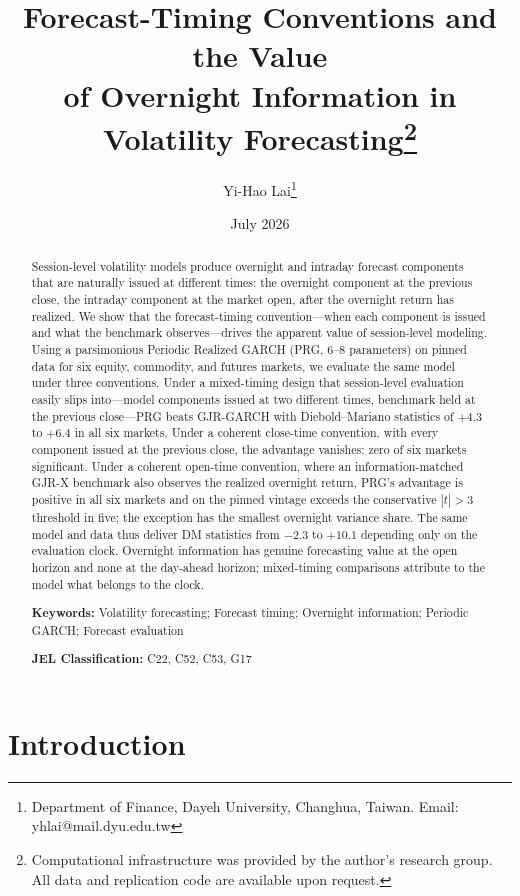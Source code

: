\documentclass[11pt,a4paper]{article}
\title{Forecast-Timing Conventions and the Value \\ of Overnight Information in Volatility Forecasting\thanks{%
Computational infrastructure was provided by the author's research group.
All data and replication code are available upon request.}}
\author{Yi-Hao Lai\thanks{%
Department of Finance, Dayeh University, Changhua, Taiwan.
Email: yhlai@mail.dyu.edu.tw}}
\date{July 2026}
\begin{document}
\maketitle

\begin{abstract}
Session-level volatility models produce overnight and intraday forecast components that are naturally issued at different times: the overnight component at the previous close, the intraday component at the market open, after the overnight return has realized. We show that the forecast-timing convention---when each component is issued and what the benchmark observes---drives the apparent value of session-level modeling. Using a parsimonious Periodic Realized GARCH (PRG, 6--8 parameters) on pinned data for six equity, commodity, and futures markets, we evaluate the same model under three conventions. Under a mixed-timing design that session-level evaluation easily slips into---model components issued at two different times, benchmark held at the previous close---PRG beats GJR-GARCH with Diebold--Mariano statistics of $+4.3$ to $+6.4$ in all six markets. Under a coherent close-time convention, with every component issued at the previous close, the advantage vanishes: zero of six markets significant. Under a coherent open-time convention, where an information-matched GJR-X benchmark also observes the realized overnight return, PRG's advantage is positive in all six markets and on the pinned vintage exceeds the conservative $|t|>3$ threshold in five; the exception has the smallest overnight variance share. The same model and data thus deliver DM statistics from $-2.3$ to $+10.1$ depending only on the evaluation clock. Overnight information has genuine forecasting value at the open horizon and none at the day-ahead horizon; mixed-timing comparisons attribute to the model what belongs to the clock.

\medskip\noindent
\textbf{Keywords:} Volatility forecasting; Forecast timing; Overnight information; Periodic GARCH; Forecast evaluation

\medskip\noindent
\textbf{JEL Classification:} C22, C52, C53, G17
\end{abstract}

\newpage

\section{Introduction}
\end{document}
